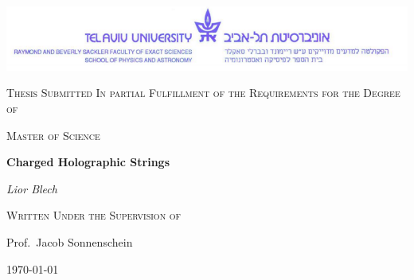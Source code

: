 \documentclass[11pt,a4paper]{article}
\begin{document}
\lstset{language=Mathematica} 


\flushbottom
\pagebreak
\begin{titlepage}
	\centering
	\includegraphics[scale=0.65]{figures/TAUlogo.png}\par\vspace{1cm}
	\vspace{1cm}
	{\scshape\Large Thesis Submitted In partial Fulfillment of the Requirements for the Degree of\par}
	\vspace{1cm}
	{\scshape\Large Master of Science\par}
	\vspace{1.5cm}
	{\huge\bfseries Charged Holographic Strings\par}
	\vspace{2cm}
	{\Large\itshape Lior Blech\par}
	\vfill
	{\scshape\Large Written Under the Supervision of\par
	Prof.~Jacob Sonnenschein}

	\vfill

	{\large \today\par}
\end{titlepage}
\begin{abstract}
We revisit the holographic description of hadrons, adding an electromagnetic interaction term and taking account of one loop corrections through a casimir energy term. We first review the theoretical background: AdS/CFT correspondence, confining gravitational backgrounds and the approximating model of the spinning string with endpoint masses, including the one loop quantum corrections. We then analyse the effect of adding the electromagnetic charges and the casimir energy. Finally we confront the results with PDG data by fitting to the Regge trajectories and attempt to further constrict the parameter space through the determination of quark mass differences.
\end{abstract}
\end{document}

